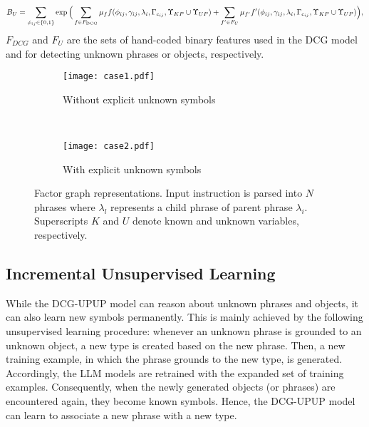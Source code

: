 \begin{equation}
B_U= \sum_{\phi_{ij} \in \{0,1\}}\exp \Big( \sum_{f \in F_{\text{DCG}}} \mu_f f(\phi_{ij},\gamma_{ij},\lambda_i,\Gamma_{c_{ij}},\Upsilon_{KP} \cup \Upsilon_{UP}) \nonumber \\
+ \sum_{f^\prime \in F_{U}} \mu_{f^\prime} f^\prime(\phi_{ij},\gamma_{ij},\lambda_i,\Gamma_{c_{ij}},\Upsilon_{KP} \cup \Upsilon_{UP}) \Big), \nonumber
\end{equation}
$F_{DCG}$ and $F_{U}$ are the sets of hand-coded binary features used in the DCG model and for detecting unknown phrases or objects, respectively.
\begin{figure}
\centering
\begin{subfigure}[t]{0.45\columnwidth}
\centering
\texttt{[image: case1.pdf]}
\caption{Without explicit unknown symbols}
\label{fig:wo_unknown}
\end{subfigure}
~
\begin{subfigure}[t]{0.51\columnwidth}
\centering
\texttt{[image: case2.pdf]}
\caption{With explicit unknown symbols}
\label{fig:w_unknown}
\end{subfigure}

\caption{Factor graph representations. Input instruction is parsed into $N$ phrases where $\lambda_l$ represents a child phrase of parent phrase $\lambda_i$. Superscripts $K$ and $U$ denote known and unknown variables, respectively.}
\end{figure}

\subsection{Incremental Unsupervised Learning}
While the DCG-UPUP model can reason about unknown phrases and objects, it can also learn new symbols permanently. This is mainly achieved by the following unsupervised learning procedure: whenever an unknown phrase is grounded to an unknown object, a new type is created based on the new phrase. Then, a new training example, in which the phrase grounds to the new
type, is generated. Accordingly, the LLM models are retrained with the expanded set of training examples. Consequently, when the newly generated objects (or phrases) are encountered again, they become known symbols. Hence, the DCG-UPUP model can learn to associate a new phrase with a new type.

